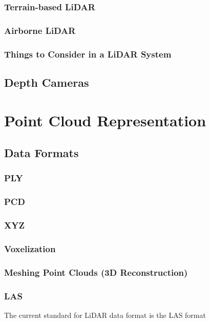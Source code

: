 \subsubsection{Terrain-based LiDAR}

\subsubsection{Airborne LiDAR}

\subsubsection{Things to Consider in a LiDAR System}

\subsection{Depth Cameras}

\section{Point Cloud Representation}

\subsection{Data Formats}

\subsubsection{PLY}

\subsubsection{PCD}

\subsubsection{XYZ}

\subsubsection{Voxelization}

\subsubsection{Meshing Point Clouds (3D Reconstruction)}


\subsubsection{LAS}
The current standard for LiDAR data format is the LAS format


